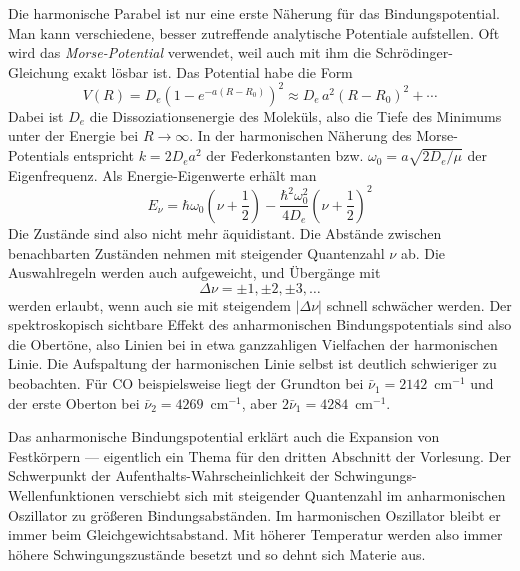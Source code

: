 Die harmonische Parabel ist nur eine erste Näherung für das Bindungspotential. Man kann verschiedene, besser zutreffende analytische Potentiale aufstellen. Oft wird das \emph{Morse-Potential} verwendet, weil auch mit ihm  die Schrödinger-Gleichung exakt lösbar ist. Das Potential habe die Form
\begin{equation}
 V(R) = D_e \left( 1 - e^{-a (R - R_0)} \right)^2 \approx D_e \, a^2 (R - R_0)^2 + \cdots
\end{equation}
Dabei ist $D_e$ die Dissoziationsenergie des Moleküls, also die Tiefe des Minimums unter der Energie bei $R \rightarrow \infty$. In der harmonischen Näherung des Morse-Potentials entspricht $k = 2 D_e a^2$ der Federkonstanten bzw. $\omega_0 = a \sqrt{2 D_e / \mu}$ der Eigenfrequenz. Als Energie-Eigenwerte erhält man
\begin{equation}
 E_\nu = \hbar \omega_0 \left( \nu  + \frac{1}{2} \right)
 - \frac{\hbar^2 \omega_0^2}{4 D_e} \left( \nu  + \frac{1}{2} \right)^2
\end{equation}
Die Zustände sind also nicht mehr äquidistant. Die Abstände zwischen benachbarten Zuständen nehmen mit steigender Quantenzahl $\nu$ ab. Die Auswahlregeln werden auch aufgeweicht, und Übergänge mit 
\begin{equation}
\Delta \nu = \pm 1, \pm 2 , \pm 3, \dots
\end{equation}
werden erlaubt, wenn auch sie mit steigendem $|\Delta \nu |$ schnell schwächer werden. Der spektroskopisch sichtbare Effekt des anharmonischen Bindungspotentials sind also die Obertöne, also Linien bei in etwa ganzzahligen Vielfachen der harmonischen Linie. Die Aufspaltung der harmonischen Linie selbst ist deutlich schwieriger zu beobachten. Für CO beispielsweise liegt der Grundton bei $\bar{\nu}_1 = 2142$~cm$^{-1}$ und der erste Oberton bei 
 $\bar{\nu}_2 = 4269$~cm$^{-1}$, aber $2 \bar{\nu}_1 = 4284$~cm$^{-1}$.
 
Das anharmonische Bindungspotential erklärt auch die Expansion von Festkörpern --- eigentlich ein Thema für den dritten Abschnitt der Vorlesung. Der Schwerpunkt der Aufenthalts-Wahrscheinlichkeit der Schwingungs-Wellenfunktionen verschiebt sich mit steigender Quantenzahl im anharmonischen Oszillator zu größeren Bindungsabständen. Im harmonischen Oszillator bleibt er immer beim Gleichgewichtsabstand. Mit höherer Temperatur werden also immer höhere Schwingungszustände besetzt und so dehnt sich Materie aus.




\printbibliography[segment=\therefsegment,heading=subbibliography]
